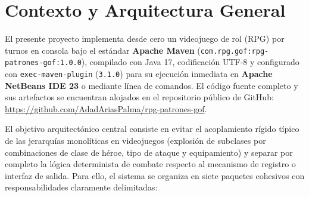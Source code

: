 \documentclass[12pt,letterpaper]{article}
\begin{document}
\tableofcontents
\newpage

\section{Contexto y Arquitectura General}

El presente proyecto implementa desde cero un videojuego de rol (RPG) por turnos en consola bajo el estándar \textbf{Apache Maven} (\texttt{com.rpg.gof:rpg-patrones-gof:1.0.0}), compilado con Java 17, codificación UTF-8 y configurado con \texttt{exec-maven-plugin} (\texttt{3.1.0}) para su ejecución inmediata en \textbf{Apache NetBeans IDE 23} o mediante línea de comandos. El código fuente completo y sus artefactos se encuentran alojados en el repositorio público de GitHub: \url{https://github.com/AdadAriasPalma/rpg-patrones-gof}.

El objetivo arquitectónico central consiste en evitar el acoplamiento rígido típico de las jerarquías monolíticas en videojuegos (explosión de subclases por combinaciones de clase de héroe, tipo de ataque y equipamiento) y separar por completo la lógica determinista de combate respecto al mecanismo de registro o interfaz de salida. Para ello, el sistema se organiza en siete paquetes cohesivos con responsabilidades claramente delimitadas:
\end{document}
